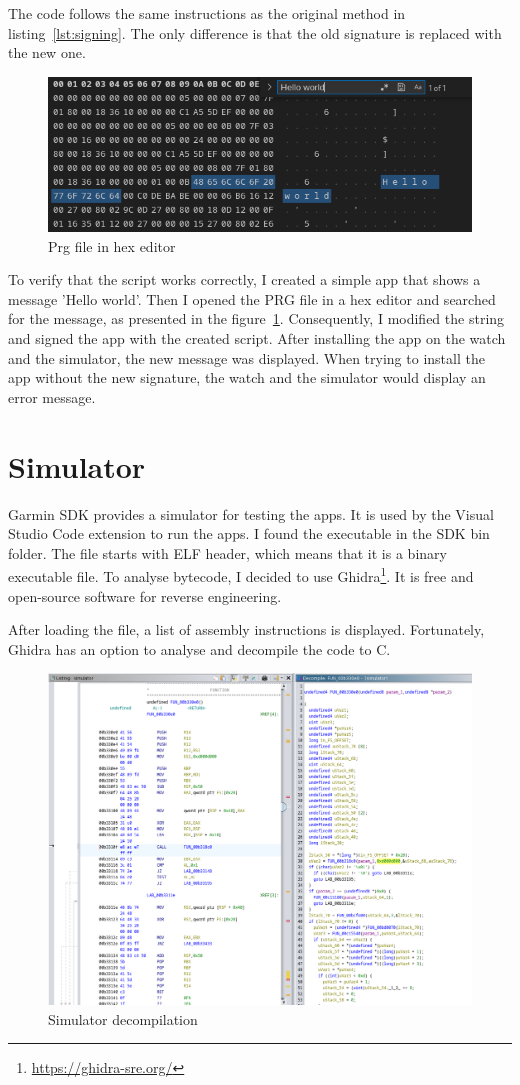 The code follows the same instructions as the original method in listing~\ref{lst:signing}.
The only difference is that the old signature is replaced with the new one.

\begin{figure}[h]
    \centering
    \includegraphics[width=0.7\linewidth]{../../images/app-hex-editor-hello-world}
    \caption{Prg file in hex editor}
    \label{fig:hello-world}
\end{figure}

To verify that the script works correctly, I created a simple app that shows a message 'Hello world'.
Then I opened the PRG file in a hex editor and searched for the message, as presented in the figure~\ref{fig:hello-world}.
Consequently, I modified the string and signed the app with the created script.
After installing the app on the watch and the simulator, the new message was displayed.
When trying to install the app without the new signature, the watch and the simulator would display an error message.

\section{Simulator}
Garmin SDK provides a simulator for testing the apps.
It is used by the Visual Studio Code extension to run the apps.
I found the executable in the SDK bin folder.
The file starts with ELF header, which means that it is a binary executable file.
To analyse bytecode, I decided to use Ghidra\footnote{\url{https://ghidra-sre.org/}}.
It is free and open-source software for reverse engineering.

After loading the file, a list of assembly instructions is displayed.
Fortunately, Ghidra has an option to analyse and decompile the code to C\@.

\begin{figure}[h]
    \centering
    \includegraphics[width=0.7\linewidth]{../../images/ghidra}
    \caption{Simulator decompilation}
    \label{fig:concept}
\end{figure}

